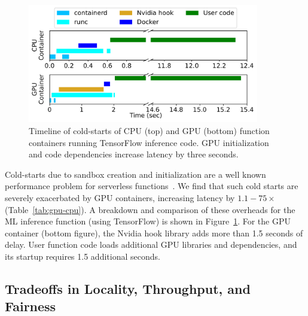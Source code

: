 \begin{figure}
  \centering
  \includegraphics[width=0.9\textwidth]{./mqfq-final/graphs/coldstart/combined_timeline.pdf}
  \caption{Timeline of cold-starts of CPU (top) and GPU (bottom) function containers running TensorFlow inference code. 
    GPU initialization and code dependencies increase latency by three seconds.}
    \label{fig:cold-timeline}
\end{figure}

Cold-starts due to sandbox creation and initialization are a well known performance problem for serverless functions~\cite{du2020catalyzer,lin_mitigating_2019,manner_cold_2018,mohan_agile_2019}.
We find that such cold starts are severely exacerbated by GPU containers, increasing latency by $1.1-75\times$ (Table~\ref{tab:gpu-cpu}).
A breakdown and comparison of these overheads for the ML inference function (using TensorFlow) is shown in Figure~\ref{fig:cold-timeline}.
For the GPU container (bottom figure), the Nvidia hook library adds more than 1.5 seconds of delay.
User function code loads additional GPU libraries and dependencies, and its startup requires 1.5 additional seconds.

\subsection{Tradeoffs in Locality, Throughput, and Fairness}

